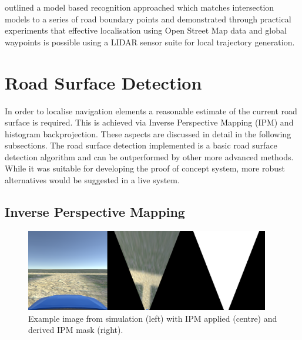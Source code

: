 \documentclass[]{aiaa-tc}%
\begin{document}
\citet{modelBasedIntersection} outlined a model based recognition approached which matches intersection models to a series of road boundary points and \citet{mitLocalNavDriving} demonstrated through practical experiments that effective localisation using Open Street Map data and global waypoints is possible using a LIDAR sensor suite for local trajectory generation.




\section{Road Surface Detection}\label{s:roadSurfaceDetection}

In order to localise navigation elements a reasonable estimate of the current road surface is required. This is achieved via Inverse Perspective Mapping (IPM) and histogram backprojection. These aspects are discussed in detail in the following subsections. The road surface detection implemented is a basic road surface detection algorithm and can be outperformed by other more advanced methods. While it was suitable for developing the proof of concept system, more robust alternatives would be suggested in a live system.

\subsection{Inverse Perspective Mapping}\label{s:ipm}

\begin{figure}
	\centering
	\includegraphics[width=0.95\textwidth]{RoadDetection/ipmSim.png}
	\caption{Example image from simulation (left) with IPM applied (centre) and derived IPM mask (right).}
	\label{f:ipmSim}
\end{figure}
\end{document}
